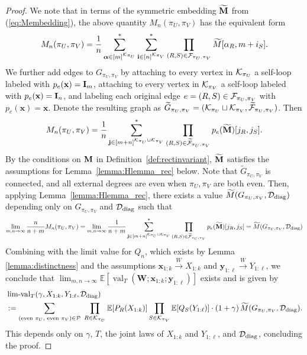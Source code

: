 \documentclass[10pt,reqno]{amsart}
\def\x{\mathbf{x}}
\def\y{\mathbf{y}}
\def\W{\mathbf{W}}
\def\E{\mathbb{E}}
\def\val{\operatorname{val}}
\def\limval{\operatorname{lim-val}}
\def\toW{\overset{W}{\to}}
\def\bi{\mathbf{i}}
\newcommand{\tdiag}{\mathrm{diag}}
\begin{document}
\begin{proof}
We note that in terms of the symmetric embedding $\widetilde{\mathbf{M}}$ from
(\ref{eq:Membedding}), the above quantity $M_n(\pi_U,\pi_V)$ has the equivalent
form
\[M_n(\pi_U,\pi_V) = \frac{1}{n} \sum_{\balpha\in[m]^{\cK_{\pi_U}}}^*
	\sum_{\bi\in[n]^{\cK_{\pi_V}}}^*
	\prod_{(R,S)\in\cF_{\pi_U,\pi_V}} 
	\widetilde M[\alpha_R,m+i_S].\]
We further add edges to $G_{\pi_U,\pi_V}$ by attaching to every vertex in 
$\mathcal{K}_{\pi_U}$ a self-loop labeled with $p_e(\x)=\bI_m$,
attaching to every vertex in $\mathcal{K}_{\pi_V}$ a self-loop labeled with
$p_e(\x)=\bI_n$, and labeling each original edge $e=(R,S) \in
\mathcal{F}_{\pi_U,\pi_V}$ with $p_e(\x)=\x$.
Denote the resulting graph as $\widetilde G_{\pi_U,\pi_V} = 
(\mathcal{K}_{\pi_U}\sqcup \mathcal{K}_{\pi_V},\widetilde{\mathcal{F}}_{\pi_U,\pi_V})$. Then 
\begin{align*}
	M_n(\pi_U,\pi_V) = \frac{1}{n} \sum_{\mathbf{j}\in[m+n]^{\mathcal{K}_{\pi_U}\sqcup\mathcal{K}_{\pi_V}}}^*
	\prod_{(R,S)\in\widetilde{\mathcal{F}}_{\pi_U,\pi_V}} 
	p_e(\widetilde{\mathbf{M}})[j_R, j_{S}].
\end{align*}
By the conditions on $\mathbf{M}$ in Definition~\ref{def:rectinvariant}, 
$\widetilde{\mathbf{M}}$ satisfies the assumptions for Lemma~\ref{lemma:Hlemma_rec}
below. Note that $\widetilde G_{\pi_U,\pi_V}$ is connected, and all external 
degrees are even when
$\pi_U,\pi_V$ are both even. Then, applying Lemma~\ref{lemma:Hlemma_rec},
there exists a value $\widetilde{M}(G_{\pi_U,\pi_V},\cD_\tdiag)$ depending only on 
$G_{\pi_U,\pi_V}$ and $\cD_\tdiag$ such that 
\begin{align*}
\lim_{m,n \to \infty} \frac{n}{n+m} M_n(\pi_U,\pi_V)=
	\lim_{m,n\to\infty} \frac{1}{n+m}
\sum_{\bj\in[m+n]^{\cK_{\pi_U}\sqcup\cK_{\pi_V}}}^*
	\prod_{(R,S)\in\widetilde\cF_{\pi_U,\pi_V}} p_e(\widetilde \bM)[j_R,j_S]
	=\widetilde{M}(G_{\pi_U,\pi_V},\cD_\tdiag)
\end{align*}
Combining with the limit value for $Q_n$, which exists by Lemma
\ref{lemma:distinctness} and the assumptions $\x_{1:k} \toW X_{1:k}$ and
$\y_{1:\ell} \toW Y_{1:\ell}$, we conclude that
$\lim_{m,n\to\infty} \E[\val_T(\W;\x_{1:k};\y_{1:\ell})]$ exists and is given by
\begin{align*}
&\limval_T(\gamma,X_{1:k},Y_{1:\ell},\cD_{\tdiag})\\
&:=\sum_{(\text{even } \pi_U,\text{ even } \pi_V) \in \cP}\;
\prod_{R \in \cK_{\pi_U}} \E[P_R(X_{1:k})]
\prod_{S \in \cK_{\pi_V}} \E[Q_S(Y_{1:\ell})]
\cdot (1+\gamma)\,\widetilde{M}(G_{\pi_U,\pi_V},\cD_\tdiag).
\end{align*}
This depends only on $\gamma$, $T$, the joint laws of $X_{1:k}$ and
$Y_{1:\ell}$, and $\cD_\tdiag$, concluding the proof.
\end{proof}
\end{document}
